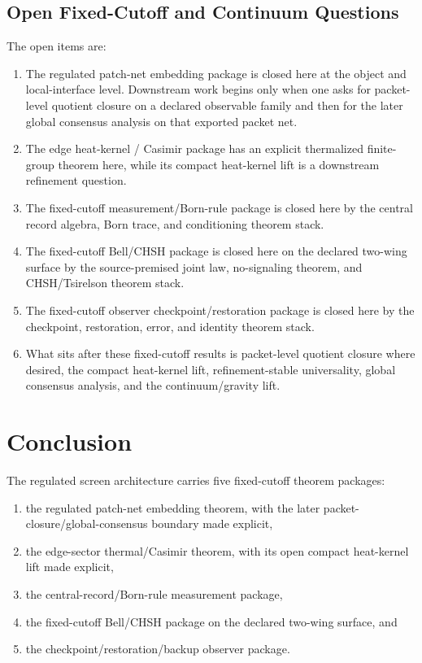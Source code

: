 \documentclass[11pt]{article}
\begin{document}
\subsection{Open Fixed-Cutoff and Continuum Questions}

The open items are:
\begin{enumerate}[leftmargin=2em]
\item The regulated patch-net embedding package is closed here at the object and local-interface
level. Downstream work begins only when one asks for packet-level quotient closure on a declared
observable family and then for the later global consensus analysis on that exported packet net.
\item The edge heat-kernel / Casimir package has an explicit thermalized finite-group theorem
here, while its compact heat-kernel lift is a downstream refinement question.
\item The fixed-cutoff measurement/Born-rule package is closed here by the central record
algebra, Born trace, and conditioning theorem stack.
\item The fixed-cutoff Bell/CHSH package is closed here on the declared two-wing surface by the
source-premised joint law, no-signaling theorem, and CHSH/Tsirelson theorem stack.
\item The fixed-cutoff observer checkpoint/restoration package is closed here by the
checkpoint, restoration, error, and identity theorem stack.
\item What sits after these fixed-cutoff results is packet-level quotient closure where
desired, the compact heat-kernel lift, refinement-stable universality, global consensus analysis,
and the continuum/gravity lift.
\end{enumerate}

\section{Conclusion}

The regulated screen architecture carries five fixed-cutoff theorem packages:
\begin{enumerate}[leftmargin=2em]
\item the regulated patch-net embedding theorem, with the later packet-closure/global-consensus boundary made explicit,
\item the edge-sector thermal/Casimir theorem, with its open compact heat-kernel lift made explicit,
\item the central-record/Born-rule measurement package,
\item the fixed-cutoff Bell/CHSH package on the declared two-wing surface, and
\item the checkpoint/restoration/backup observer package.
\end{enumerate}
\end{document}
